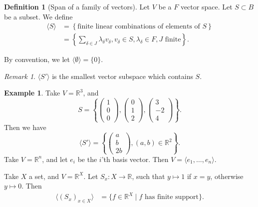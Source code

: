 \documentclass[12pt]{article}
\theoremstyle{definition}
\newtheorem{definition}{Definition}[section]
\newtheorem{example}{Example}[section]
\theoremstyle{remark}
\newtheorem*{remark}{Remark}
\begin{document}
\begin{definition}[Span of a family of vectors]
	Let $V$ be a $F$ vector space. Let $S \subset B$ be a subset. We define
	\begin{align*}
		\langle S \rangle &= \left\{ \text{finite linear combinations of elements of } S \right\} \\
				  &= \left\{ \sum_{\delta \in J} \lambda_{\delta} v_{\delta},  v_{\delta} \in S,  \lambda_{\delta} \in F, J \text{ finite} \right\}.
	\end{align*}
\end{definition}

By convention, we let $\langle \emptyset \rangle = \{0\}$.

\begin{remark}
	$\langle S' \rangle$ is the smallest vector subspace which contains $S$.
\end{remark}

\begin{adjustbox}{minipage = \columnwidth - 25.5pt, margin=1em, frame=1pt, margin=0em}
\begin{example}
	Take $V = \mathbb{R}^3$, and
	\[
	S = \left\{
		\begin{pmatrix}
			1 \\
			0 \\
			0
		\end{pmatrix}
		,
		\begin{pmatrix}
			0 \\
			1\\
			2
		\end{pmatrix}
		,
		\begin{pmatrix}
			3 \\
			-2 \\
			4
		\end{pmatrix}
	\right\}
	.\]
	Then we have
	\[
		\langle S' \rangle = \left\{
			\begin{pmatrix}
				a \\
				b \\
				2b
			\end{pmatrix}
			,
		(a, b) \in \mathbb{R}^2\right\}
	.\]
	Take $V = \mathbb{R}^{n}$, and let $e_i$ be the $i$'th basis vector. Then $V = \langle e_1, \ldots, e_n \rangle$.

	Take $X$ a set, and $V = \mathbb{R}^{X}$. Let $S_x : X \to \mathbb{R}$, such that $y \mapsto 1$ if $x = y$, otherwise $y \mapsto 0$. Then
	\begin{align*}
		\langle (S_x)_{x \in X} \rangle &= \{f \in \mathbb{R}^{X} \mid f \text{ has finite support}\}.
	\end{align*}
\end{example}

\end{adjustbox}
\end{document}
